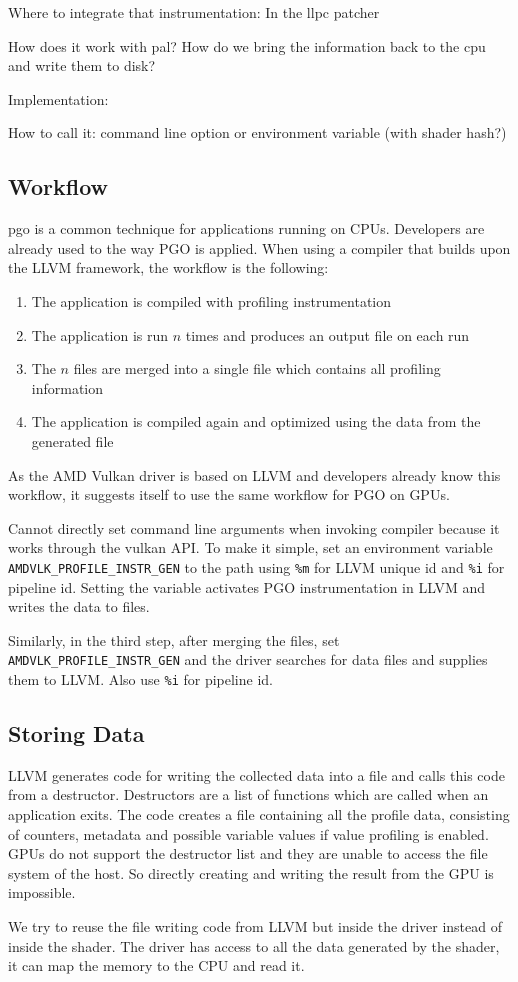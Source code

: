 \clearpage
{}
Where to integrate that instrumentation: In the llpc patcher

How does it work with pal?
How do we bring the information back to the cpu and write them to disk?

Implementation:

How to call it: command line option or environment variable (with shader hash?)

\subsection{Workflow}
\label{sub:workflow}
\Gls{pgo} is a common technique for applications running on CPUs.
Developers are already used to the way PGO is applied.
When using a compiler that builds upon the LLVM framework, the workflow is the following:
\begin{enumerate}
	\item The application is compiled with profiling instrumentation
	\item The application is run $n$ times and produces an output file on each run
	\item The $n$ files are merged into a single file which contains all profiling information
	\item The application is compiled again and optimized using the data from the generated file
\end{enumerate}
As the AMD Vulkan driver is based on LLVM and developers already know this workflow,
it suggests itself to use the same workflow for PGO on GPUs.

Cannot directly set command line arguments when invoking compiler because it works through the vulkan API.
To make it simple, set an environment variable \texttt{AMDVLK\_PROFILE\_INSTR\_GEN} to the path using \texttt{\%m} for LLVM unique id and \texttt{\%i} for pipeline id.
Setting the variable activates PGO instrumentation in LLVM and writes the data to files.

Similarly, in the third step, after merging the files, set \texttt{AMDVLK\_PROFILE\_INSTR\_GEN} and the driver searches for data files and supplies them to LLVM. Also use \texttt{\%i} for pipeline id.

\subsection{Storing Data}
\label{sub:save-design}
LLVM generates code for writing the collected data into a file and calls this code from a destructor.
Destructors are a list of functions which are called when an application exits.
The code creates a file containing all the profile data, consisting of counters, metadata and possible variable values if value profiling is enabled.
GPUs do not support the destructor list and they are unable to access the file system of the host.
So directly creating and writing the result from the GPU is impossible.

We try to reuse the file writing code from LLVM but inside the driver instead of inside the shader.
The driver has access to all the data generated by the shader, it can map the memory to the CPU and read it.